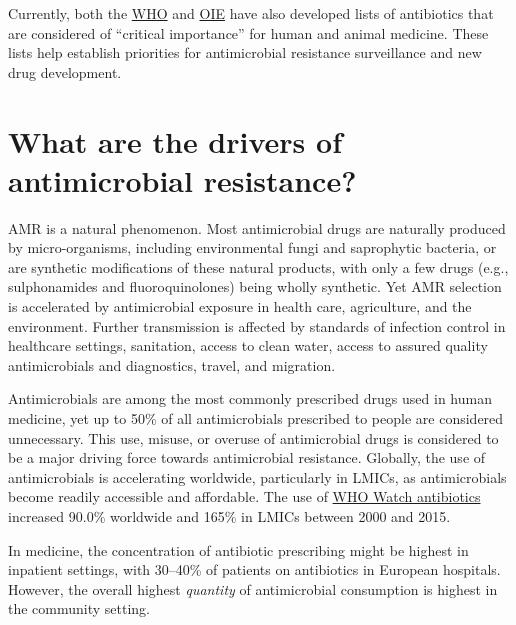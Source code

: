 \documentclass[
]{book}
\begin{document}
Currently, both the \href{https://apps.who.int/iris/bitstream/handle/10665/312266/9789241515528-eng.pdf}{WHO} and \href{https://www.oie.int/en/what-we-do/global-initiatives/antimicrobial-resistance/\#ui-id-4}{OIE} have also developed lists of antibiotics that are considered of ``critical importance'' for human and animal medicine. These lists help establish priorities for antimicrobial resistance surveillance and new drug development.

\hypertarget{what-are-the-drivers-of-antimicrobial-resistance}{%
\section*{What are the drivers of antimicrobial resistance?}\label{what-are-the-drivers-of-antimicrobial-resistance}}

AMR is a natural phenomenon. Most antimicrobial drugs are naturally produced by micro-organisms, including environmental fungi and saprophytic bacteria, or are synthetic modifications of these natural products, with only a few drugs (e.g., sulphonamides and fluoroquinolones) being wholly synthetic. Yet AMR selection is accelerated by antimicrobial exposure in health care, agriculture, and the environment. Further transmission is affected by standards of infection control in healthcare settings, sanitation, access to clean water, access to assured quality antimicrobials and diagnostics, travel, and migration.

Antimicrobials are among the most commonly prescribed drugs used in human medicine, yet up to 50\% of all antimicrobials prescribed to people are considered unnecessary. This use, misuse, or overuse of antimicrobial drugs is considered to be a major driving force towards antimicrobial resistance. Globally, the use of antimicrobials is accelerating worldwide, particularly in LMICs, as antimicrobials become readily accessible and affordable. The use of \href{https://www.who.int/news/item/01-10-2019-who-releases-the-2019-aware-classification-antibiotics}{WHO Watch antibiotics} increased 90.0\% worldwide and 165\% in LMICs between 2000 and 2015.

In medicine, the concentration of antibiotic prescribing might be highest in inpatient settings, with 30--40\% of patients on antibiotics in European hospitals. However, the overall highest \emph{quantity} of antimicrobial consumption is highest in the community setting.
\end{document}
